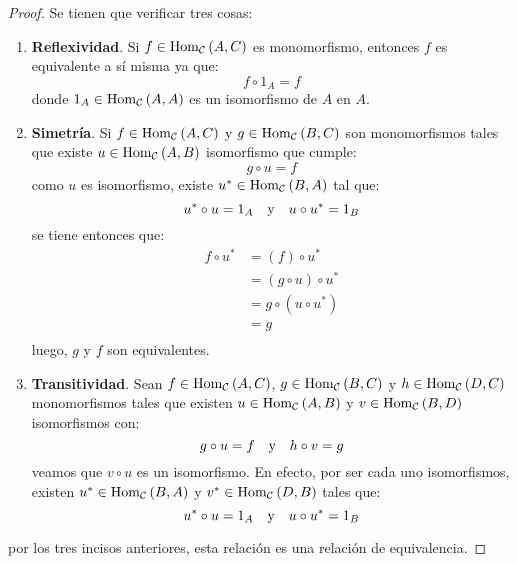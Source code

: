 \documentclass[12pt]{report}
\theoremstyle{largebreak}
\newcommand{\Hom}[3]{\ensuremath{\textup{Hom}_{#1}\left(#2,#3\right)}}
\begin{document}
    \begin{proof}
        Se tienen que verificar tres cosas:
        \begin{enumerate}
            \item \textbf{Reflexividad}. Si $f\in\Hom{\mathcal{C}}{A}{C}$ es monomorfismo, entonces $f$ es equivalente a sí misma ya que:
            \begin{equation*}
                f\circ 1_A=f
            \end{equation*}
            donde $1_A\in\Hom{\mathcal{C}}{A}{A}$ es un isomorfismo de $A$ en $A$.
            \item \textbf{Simetría}. Si $f\in\Hom{\mathcal{C}}{A}{C}$ y $g\in\Hom{\mathcal{C}}{B}{C}$ son monomorfismos tales que existe $u\in\Hom{\mathcal{C}}{A}{B}$ isomorfismo que cumple:
            \begin{equation*}
                g\circ u=f
            \end{equation*}
            como $u$ es isomorfismo, existe $u^*\in\Hom{\mathcal{C}}{B}{A}$ tal que:
            \begin{equation*}
                u^*\circ u=1_A \quad\textup{y}\quad u\circ u^*=1_B
            \end{equation*}
            se tiene entonces que:
            \begin{equation*}
                \begin{split}
                    f\circ u^*&=(f)\circ u^*\\
                    &=(g\circ u)\circ u^*\\
                    &=g\circ(u\circ u^*)\\
                    &=g\\
                \end{split}
            \end{equation*}
            luego, $g$ y $f$ son equivalentes.
            \item \textbf{Transitividad}. Sean $f\in\Hom{\mathcal{C}}{A}{C}$, $g\in\Hom{\mathcal{C}}{B}{C}$ y $h\in\Hom{\mathcal{C}}{D}{C}$ monomorfismos tales que existen $u\in\Hom{\mathcal{C}}{A}{B}$ y $v\in\Hom{\mathcal{C}}{B}{D}$ isomorfismos con:
            \begin{equation*}
                g\circ u=f\quad\textup{y}\quad h\circ v=g
            \end{equation*}
            veamos que $v\circ u$ es un isomorfismo. En efecto, por ser cada uno isomorfismos, existen $u^*\in\Hom{\mathcal{C}}{B}{A}$ y $v^*\in\Hom{\mathcal{C}}{D}{B}$ tales que:
            \begin{equation*}
                u^*\circ u=1_A\quad\textup{y}\quad u\circ u^*=1_B
            \end{equation*}
        \end{enumerate}
        por los tres incisos anteriores, esta relación es una relación de equivalencia.
    \end{proof}
\end{document}

